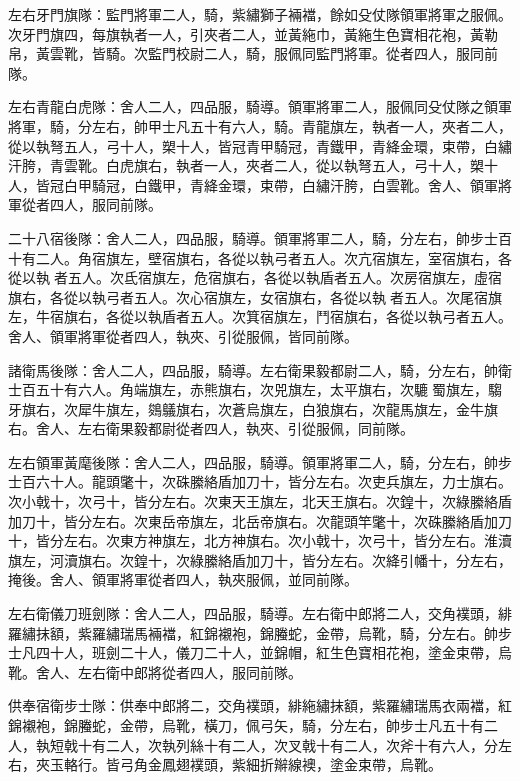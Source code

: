 \begin{pinyinscope}
 左右牙門旗隊：監門將軍二人，騎，紫繡獅子裲襠，餘如殳仗隊領軍將軍之服佩。次牙門旗四，每旗執者一人，引夾者二人，並黃絁巾，黃絁生色寶相花袍，黃勒帛，黃雲靴，皆騎。次監門校尉二人，騎，服佩同監門將軍。從者四人，服同前隊。



 左右青龍白虎隊：舍人二人，四品服，騎導。領軍將軍二人，服佩同殳仗隊之領軍將軍，騎，分左右，帥甲士凡五十有六人，騎。青龍旗左，執者一人，夾者二人，從以執弩五人，弓十人，槊十人，皆冠青甲騎冠，青鐵甲，青絳金環，束帶，白繡汗胯，青雲靴。白虎旗右，執者一人，夾者二人，從以執弩五人，弓十人，槊十人，皆冠白甲騎冠，白鐵甲，青絳金環，束帶，白繡汗胯，白雲靴。舍人、領軍將軍從者四人，服同前隊。



 二十八宿後隊：舍人二人，四品服，騎導。領軍將軍二人，騎，分左右，帥步士百十有二人。角宿旗左，壁宿旗右，各從以執弓者五人。次亢宿旗左，室宿旗右，各從以執者五人。次氐宿旗左，危宿旗右，各從以執盾者五人。次房宿旗左，虛宿旗右，各從以執弓者五人。次心宿旗左，女宿旗右，各從以執者五人。次尾宿旗左，牛宿旗右，各從以執盾者五人。次箕宿旗左，鬥宿旗右，各從以執弓者五人。舍人、領軍將軍從者四人，執夾、引從服佩，皆同前隊。



 諸衛馬後隊：舍人二人，四品服，騎導。左右衛果毅都尉二人，騎，分左右，帥衛士百五十有六人。角端旗左，赤熊旗右，次兕旗左，太平旗右，次騼蜀旗左，騶牙旗右，次犀牛旗左，鵕鸃旗右，次蒼烏旗左，白狼旗右，次龍馬旗左，金牛旗右。舍人、左右衛果毅都尉從者四人，執夾、引從服佩，同前隊。



 左右領軍黃麾後隊：舍人二人，四品服，騎導。領軍將軍二人，騎，分左右，帥步士百六十人。龍頭氅十，次硃縢絡盾加刀十，皆分左右。次吏兵旗左，力士旗右。次小戟十，次弓十，皆分左右。次東天王旗左，北天王旗右。次鍠十，次綠縢絡盾加刀十，皆分左右。次東岳帝旗左，北岳帝旗右。次龍頭竿氅十，次硃縢絡盾加刀十，皆分左右。次東方神旗左，北方神旗右。次小戟十，次弓十，皆分左右。淮瀆旗左，河瀆旗右。次鍠十，次綠縢絡盾加刀十，皆分左右。次絳引幡十，分左右，掩後。舍人、領軍將軍從者四人，執夾服佩，並同前隊。



 左右衛儀刀班劍隊：舍人二人，四品服，騎導。左右衛中郎將二人，交角襆頭，緋羅繡抹額，紫羅繡瑞馬裲襠，紅錦襯袍，錦螣蛇，金帶，烏靴，騎，分左右。帥步士凡四十人，班劍二十人，儀刀二十人，並錦帽，紅生色寶相花袍，塗金束帶，烏靴。舍人、左右衛中郎將從者四人，服同前隊。



 供奉宿衛步士隊：供奉中郎將二，交角襆頭，緋絁繡抹額，紫羅繡瑞馬衣兩襠，紅錦襯袍，錦螣蛇，金帶，烏靴，橫刀，佩弓矢，騎，分左右，帥步士凡五十有二人，執短戟十有二人，次執列絲十有二人，次叉戟十有二人，次斧十有六人，分左右，夾玉輅行。皆弓角金鳳翅襆頭，紫細折辮線襖，塗金束帶，烏靴。




\end{pinyinscope}
